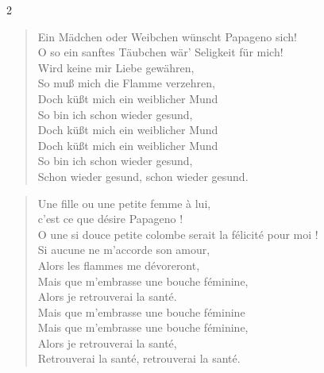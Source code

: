\documentclass[a4paper,12pt]{article}
\newcommand\chunks[2]{%
\begin{leftcolumn*}\begin{otherlanguage}{german}%
{#1}%
\end{otherlanguage}\end{leftcolumn*}%
\begin{rightcolumn}\begin{otherlanguage}{french}%
{#2}%
\end{otherlanguage}\end{rightcolumn}%
}
\begin{document}
\begin{paracol}{2}
  \chunks{\begin{verse}
          Ein Mädchen oder Weibchen wünscht Papageno sich!\\
          O so ein sanftes Täubchen wär’ Seligkeit für mich!\\
          Wird keine mir Liebe gewähren,\\
          So muß mich die Flamme verzehren,\\
          Doch küßt mich ein weiblicher Mund\\
          So bin ich schon wieder gesund,\\
          Doch küßt mich ein weiblicher Mund\\
          Doch küßt mich ein weiblicher Mund\\
          So bin ich schon wieder gesund,\\
          Schon wieder gesund, schon wieder gesund.
          \end{verse}}
         {\begin{verse}
          Une fille ou une petite femme à lui,\\
          c’est ce que désire Papageno !\\
          O une si douce petite colombe serait la félicité pour moi !\\
          Si aucune ne m’accorde son amour,\\
          Alors les flammes me dévoreront,\\
          Mais que m’embrasse une bouche féminine,\\
          Alors je retrouverai la santé.\\
          Mais que m’embrasse une bouche féminine\\
          Mais que m’embrasse une bouche féminine,\\
          Alors je retrouverai la santé,\\
          Retrouverai la santé, retrouverai la santé.
          \end{verse}}
\end{paracol}
\end{document}
